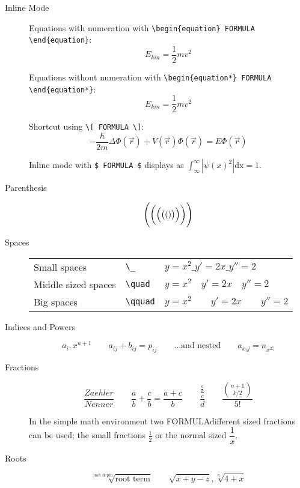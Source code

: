 \documentclass[10pt,a4paper]{scrartcl}
\begin{document}
\begin{description}

\item[Inline Mode]
Equations with numeration with \verb$\begin{equation} FORMULA \end{equation}$:
\begin{equation} 
E_{kin} = \frac 1 2 m v^2
\end{equation}

Equations without numeration with \verb$\begin{equation*} FORMULA \end{equation*}$:
\begin{equation*} 
E_{kin} = \frac 1 2 m v^2
\end{equation*}

Shortcut using \verb$\[ FORMULA \]$:
\[ -\frac{\hbar}{2m}\Delta\Phi(\vec r) + V(\vec r)\Phi(\vec r) = E\Phi(\vec r) \]

Inline mode with \verb|$ FORMULA $| displays as 
$\int_\infty^\infty |\psi(x)^2|\mathrm{dx} = 1$.

\item[Parenthesis]
\[ \Biggl( \biggl( \Bigl( \bigl( ( ) \bigr) \Bigr) \biggr) \Biggr) \]

\item[Spaces]
\begin{tabular}[t]{lll}
Small spaces        & \verb$\_$     & $ y=x^{2} \_ y'=2x \_  y''=2 $ \\
Middle sized spaces & \verb$\quad$  & $ y=x^{2} \quad y'=2x \quad  y''=2 $ \\
Big spaces          & \verb$\qquad$ & $ y=x^{2} \qquad y'=2x \qquad  y''=2 $
\end{tabular}

\item[Indices and Powers]
\[ a_i, x^{n+1} \qquad a_{ij} + b_{ij} = p_{ij} \qquad 
    \text{\ldots and nested} \qquad
    a_{x_ij} = n_{x^{2^b_n}} \]

\item[Fractions]
\[  \frac{Zaehler}{Nenner} \qquad 
    \frac{a}{b} + \frac{c}{b} = \frac{ a+c}{b} \qquad
    \frac{\frac{\frac{a}{b}}{c}}{d} \qquad
    \frac {{n+1 \choose k/2}} {5!} \]

\noindent In the simple math environment two FORMULAdifferent sized fractions can be 
used; the small fractions $\frac{1}{2}$ or the normal sized $\dfrac{1}{x}$.

\item[Roots]	
\[  \sqrt[\text{root depth}]{\text{root term}} \qquad
    \sqrt{x+y-z}, \sqrt[5]{4+x} \]
		

\end{description}
\end{document}
